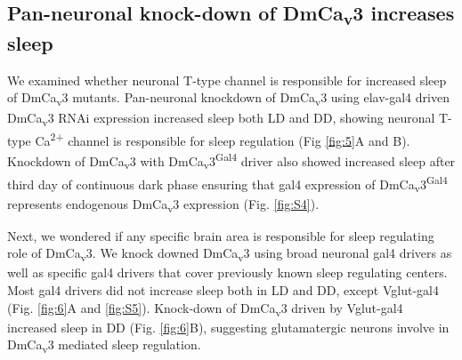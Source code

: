 \subsection*{Pan-neuronal knock-down of DmCa\textsubscript{v}3 increases sleep}

We examined whether neuronal T-type channel is responsible for increased sleep of DmCa\textsubscript{v}3 mutants.
Pan-neuronal knockdown of DmCa\textsubscript{v}3 using elav-gal4 driven DmCa\textsubscript{v}3 RNAi expression increased sleep both LD and DD, showing neuronal T-type Ca\textsuperscript{2+} channel is responsible for sleep regulation (Fig \ref{fig:5}A and B).
Knockdown of DmCa\textsubscript{v}3 with DmCa\textsubscript{v}3\textsuperscript{Gal4} driver also showed increased sleep after third day of continuous dark phase ensuring that gal4 expression of DmCa\textsubscript{v}3\textsuperscript{Gal4} represents endogenous DmCa\textsubscript{v}3 expression (Fig. \ref{fig:S4}). 

Next, we wondered if any specific brain area is responsible for sleep regulating role of DmCa\textsubscript{v}3.
We knock downed DmCa\textsubscript{v}3 using broad neuronal gal4 drivers as well as specific gal4 drivers that cover previously known sleep regulating centers.
Most gal4 drivers did not increase sleep both in LD and DD, except Vglut-gal4 (Fig. \ref{fig:6}A and \ref{fig:S5}).
Knock-down of DmCa\textsubscript{v}3 driven by Vglut-gal4 increased sleep in DD (Fig. \ref{fig:6}B), suggesting glutamatergic neurons involve in DmCa\textsubscript{v}3 mediated sleep regulation.